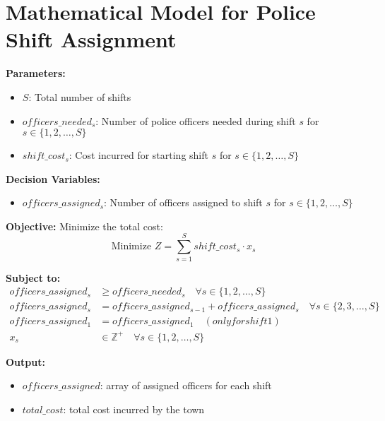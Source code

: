 \documentclass{article}
\begin{document}
\section*{Mathematical Model for Police Shift Assignment}

\textbf{Parameters:}
\begin{itemize}
    \item $S$: Total number of shifts
    \item $officers\_needed_s$: Number of police officers needed during shift $s$ for $s \in \{1, 2, \ldots, S\}$
    \item $shift\_cost_s$: Cost incurred for starting shift $s$ for $s \in \{1, 2, \ldots, S\}$
\end{itemize}

\textbf{Decision Variables:}
\begin{itemize}
    \item $officers\_assigned_s$: Number of officers assigned to shift $s$ for $s \in \{1, 2, \ldots, S\}$
\end{itemize}

\textbf{Objective:} 
Minimize the total cost:
\[
\text{Minimize } Z = \sum_{s=1}^{S} shift\_cost_s \cdot x_s
\]

\textbf{Subject to:}
\begin{align*}
officers\_assigned_s & \geq officers\_needed_s \quad \forall s \in \{1, 2, \ldots, S\} \\
officers\_assigned_s & = officers\_assigned_{s-1} + officers\_assigned_s \quad \forall s \in \{2, 3, \ldots, S\}\\
officers\_assigned_1 & = officers\_assigned_1 \quad (only for shift 1)\\
x_s & \in \mathbb{Z}^+ \quad \forall s \in \{1, 2, \ldots, S\}
\end{align*}

\textbf{Output:}
\begin{itemize}
    \item $officers\_assigned$: array of assigned officers for each shift
    \item $total\_cost$: total cost incurred by the town
\end{itemize}
\end{document}
